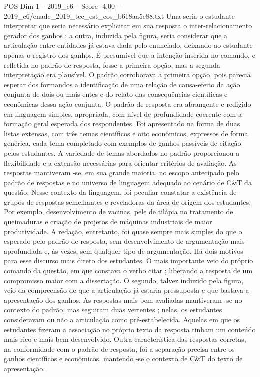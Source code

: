\begin{textsample}{POS Dim 1 – 2019\_c6 – Score -4.00 – 2019\_c6/enade\_2019\_tec\_est\_cos\_b618aa5e88.txt}
Uma seria o estudante interpretar que seria necessário explicitar em sua resposta o inter-relacionamento gerador dos ganhos ; a outra, induzida pela figura, seria considerar que a articulação entre entidades já estava dada pelo enunciado, deixando ao estudante apenas o registro dos ganhos.
É presumível que a intenção inserida no comando, e refletida no padrão de resposta, fosse a primeira opção, mas a segunda interpretação era plausível.
O padrão corroborava a primeira opção, pois parecia esperar dos formandos a identificação de uma relação de causa-efeito da ação conjunta de dois ou mais entes e do relato das consequências científicas e econômicas dessa ação conjunta.
O padrão de resposta era abrangente e redigido em linguagem simples, apropriada, com nível de profundidade coerente com a formação geral esperada dos respondentes.
Foi apresentado na forma de duas listas extensas, com três temas científicos e oito econômicos, expressos de forma genérica, cada tema completado com exemplos de ganhos passíveis de citação pelos estudantes.
A variedade de temas abordados no padrão proporcionou a flexibilidade e a extensão necessárias para orientar critérios de avaliação.
As respostas mantiveram -se, em sua grande maioria, no escopo antecipado pelo padrão de respostas e no universo de linguagem adequado ao cenário de C\&T da questão.
Nesse contexto da linguagem, foi peculiar constatar a existência de grupos de respostas semelhantes e reveladoras da área de origem dos estudantes.
Por exemplo, desenvolvimento de vacinas, pele de tilápia no tratamento de queimaduras e criação de projetos de máquinas industriais de maior produtividade.
A redação, entretanto, foi quase sempre mais simples do que o esperado pelo padrão de resposta, sem desenvolvimento de argumentação mais aprofundada e, às vezes, sem qualquer tipo de argumentação.
Há dois motivos para esse discurso mais direto dos estudantes.
O mais importante veio do próprio comando da questão, em que constava o verbo citar ; liberando a resposta de um compromisso maior com a dissertação.
O segundo, talvez induzido pela figura, veio da compreensão de que a articulação já estaria pressuposta e que bastava a apresentação dos ganhos.
As respostas mais bem avaliadas mantiveram -se no contexto do padrão, mas seguiram duas vertentes ; nelas, os estudantes consideravam ou não a articulação como pré-estabelecida.
Aquelas em que os estudantes fizeram a associação no próprio texto da resposta tinham um conteúdo mais rico e mais bem desenvolvido.
Outra característica das respostas corretas, na conformidade com o padrão de resposta, foi a separação precisa entre os ganhos científicos e econômicos, mantendo -se o contexto de C\&T do texto de apresentação.

\end{textsample}
